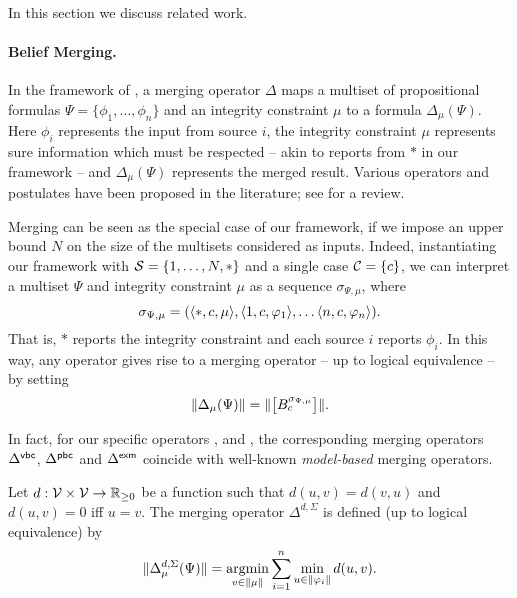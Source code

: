 In this section we discuss related work.

\paragraph{Belief Merging.}

In the framework of \textcite{konieczny2002merging}, a merging operator
$\Delta$ maps a multiset of propositional formulas $\Psi =
\{\phi_1,\ldots,\phi_n\}$ and an integrity constraint $\mu$ to a formula
$\Delta_\mu(\Psi)$. Here $\phi_i$ represents the input from source $i$, the
integrity constraint $\mu$ represents sure information which must be respected
-- akin to reports from $\ast$ in our framework -- and $\Delta_\mu(\Psi)$
represents the merged result. Various operators and postulates have been
proposed in the literature; see \cite{Konieczny_2011} for a review.

Merging can be seen as the special case of our framework, if we impose an upper
bound $N$ on the size of the multisets considered as inputs. Indeed,
instantiating our framework with $\mathcal{S} = \{1, \ldots, N, \ast\}$ and a single
case $\mathcal{C} = \{c\}$, we can interpret a multiset $\Psi$ and integrity constraint
$\mu$ as a sequence $\sigma_{\Psi, \mu}$, where
\[
    \sigma_{\Psi, \mu}
    = (
        \langle {\ast, c, \mu} \rangle,
        \langle {1, c, \varphi_1} \rangle,
        \ldots
        \langle {n, c, \varphi_n} \rangle
    ).
\]
That is, $\ast$ reports the integrity constraint and each source $i$ reports
$\phi_i$.\footnotemark{}
%
In this way, any operator gives rise to a merging operator -- up to logical
equivalence -- by setting
\begin{equation}
    \label{kr_eqn_belief_merging_translation}
    \|{\Delta_\mu(\Psi)}\|
    =
    \|{\left[{B^{\sigma_{\Psi,\mu}}_c}\right]}\|.
\end{equation}


In fact, for our specific operators \varbasedcond{}, \partbasedcond{} and
\scorebasedop{}, the corresponding merging operators $\Delta^{\mathsf{vbc}}$,
$\Delta^{\mathsf{pbc}}$ and $\Delta^{\mathsf{exm}}$ coincide with well-known \emph{model-based}
merging operators.

\begin{definition}
    Let $d: \mathcal{V} \times \mathcal{V} \to \mathbb{R}_{\ge 0}$ be a function such that
    $d(u, v) = d(v, u)$ and $d(u, v) = 0$ iff $u = v$.\footnotemark{} The
    merging operator $\Delta^{d, {\Sigma}}$ is defined (up to logical
    equivalence) by
    \[
        \propmods{\Delta^{d, {\Sigma}}_\mu(\Psi)}
        =
        \argmin_{v \in \propmods{\mu}}{
            \sum_{i=1}^{n}{
                \min_{u \in \propmods{\phi_i}}{
                    d(u, v)
                }
            }
        }.
    \]
\end{definition}

